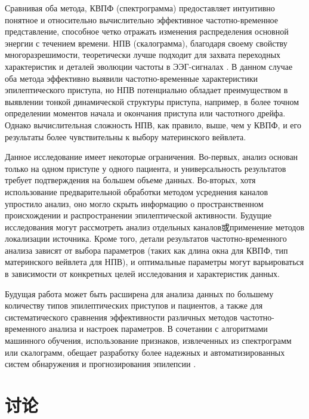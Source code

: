 \documentclass{article}
\providecommand{\pcsync}{\par\vspace{\baselineskip}} %
\begin{document}
\begin{paracol}{2}
Сравнивая оба метода, КВПФ (спектрограмма) предоставляет интуитивно понятное и относительно вычислительно эффективное частотно-временное представление, способное четко отражать изменения распределения основной энергии с течением времени. НПВ (скалограмма), благодаря своему свойству многоразрешимости, теоретически лучше подходит для захвата переходных характеристик и деталей эволюции частоты в ЭЭГ-сигналах \cite{Torrence1998}. В данном случае оба метода эффективно выявили частотно-временные характеристики эпилептического приступа, но НПВ потенциально обладает преимуществом в выявлении тонкой динамической структуры приступа, например, в более точном определении моментов начала и окончания приступа или частотного дрейфа. Однако вычислительная сложность НПВ, как правило, выше, чем у КВПФ, и его результаты более чувствительны к выбору материнского вейвлета.

Данное исследование имеет некоторые ограничения. Во-первых, анализ основан только на одном приступе у одного пациента, и универсальность результатов требует подтверждения на большем объеме данных. Во-вторых, хотя использование предварительной обработки методом усреднения каналов упростило анализ, оно могло скрыть информацию о пространственном происхождении и распространении эпилептической активности. Будущие исследования могут рассмотреть анализ отдельных каналов或применение методов локализации источника. Кроме того, детали результатов частотно-временного анализа зависят от выбора параметров (таких как длина окна для КВПФ, тип материнского вейвлета для НПВ), и оптимальные параметры могут варьироваться в зависимости от конкретных целей исследования и характеристик данных.

Будущая работа может быть расширена для анализа данных по большему количеству типов эпилептических приступов и пациентов, а также для систематического сравнения эффективности различных методов частотно-временного анализа и настроек параметров. В сочетании с алгоритмами машинного обучения, использование признаков, извлеченных из спектрограмм или скалограмм, обещает разработку более надежных и автоматизированных систем обнаружения и прогнозирования эпилепсии \cite{Boashash2015}.

\switchcolumn %

\section{讨论}
\pcsync


\end{paracol}
\end{document}
